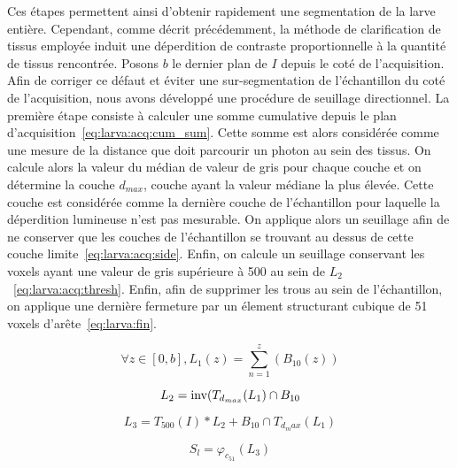 \documentclass[\main/main.tex]{subfiles}
\begin{document}
%
Ces étapes permettent ainsi d'obtenir rapidement une segmentation de la larve entière.
%
Cependant, comme décrit précédemment,
la méthode de clarification de tissus employée induit une déperdition de contraste proportionnelle à la quantité de tissus rencontrée.
%
Posons $b$ le dernier plan de $I$ depuis le coté de l'acquisition.
%
Afin de corriger ce défaut et éviter une sur-segmentation de l'échantillon du coté de l'acquisition, nous avons développé une procédure de seuillage directionnel.
%
La première étape consiste à calculer une somme cumulative depuis le plan d'acquisition~\eqref{eq:larva:acq:cum_sum}.
%
Cette somme est alors considérée comme une mesure de la distance que doit parcourir un photon au sein des tissus.
%
On calcule alors la valeur du médian de valeur de gris pour chaque couche et on détermine la couche $d_{max}$, couche ayant la valeur médiane la plus élevée.
%
Cette couche est considérée comme la dernière couche de l'échantillon pour laquelle la déperdition lumineuse n'est pas mesurable.
%
On applique alors un seuillage afin de ne conserver que les couches de l'échantillon se trouvant au dessus de cette couche limite~\eqref{eq:larva:acq:side}.
%
Enfin, on calcule un seuillage conservant les voxels ayant une valeur de gris supérieure à 500 au sein de $L_2$~\eqref{eq:larva:acq:thresh}.
%
Enfin, afin de supprimer les trous au sein de l'échantillon, on applique une dernière fermeture par un élement structurant cubique de 51 voxels d'arête~\eqref{eq:larva:fin}.

\begin{equation}
    \label{eq:larva:acq:cum_sum}
        \forall z \in [0,b], L_1(z)=\sum_{n=1}^{z}(B_{10}(z))
\end{equation}

\begin{equation}
    \label{eq:larva:acq:side}
    L_2 = \operatorname{\textnormal{inv}}(T_{d_{max}}(L_1) \cap B_{10}
\end{equation}

\begin{equation}
    \label{eq:larva:acq:thresh}
    L_3 = T_{500}(I) * L_2 + B_{10} \cap T_{d_max}(L_1)
\end{equation}

\begin{equation}
    \label{eq:larva:fin}
    S_l = \varphi_{c_{51}}(L_3)
\end{equation}
\end{document}
